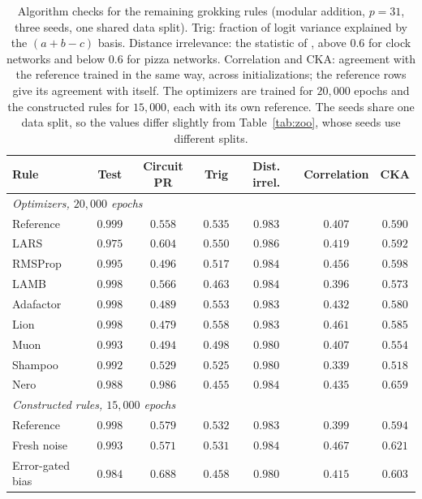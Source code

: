\documentclass{article} %
\begin{document}
\begin{table}[!ht]
\caption{Algorithm checks for the remaining grokking rules (modular addition, $p=31$, three seeds, one shared data split). Trig: fraction of logit variance explained by the $(a+b-c)$ basis. Distance irrelevance: the statistic of \citet{zhong2023clock}, above $0.6$ for clock networks and below $0.6$ for pizza networks. Correlation and CKA: agreement with the reference trained in the same way, across initializations; the reference rows give its agreement with itself. The optimizers are trained for $20{,}000$ epochs and the constructed rules for $15{,}000$, each with its own reference. The seeds share one data split, so the values differ slightly from Table~\ref{tab:zoo}, whose seeds use different splits.}
\label{tab:algoall}
\begin{center}
\small
\setlength{\tabcolsep}{3pt}
\begin{tabular}{lcccccc}
\toprule
Rule & Test & Circuit PR & Trig & Dist. irrel. & Correlation & CKA \\
\midrule
\multicolumn{7}{l}{\emph{Optimizers, $20{,}000$ epochs}} \\
Reference & $0.999$ & $0.558$ & $0.535$ & $0.983$ & $0.407$ & $0.590$ \\
LARS & $0.975$ & $0.604$ & $0.550$ & $0.986$ & $0.419$ & $0.592$ \\
RMSProp & $0.995$ & $0.496$ & $0.517$ & $0.984$ & $0.456$ & $0.598$ \\
LAMB & $0.998$ & $0.566$ & $0.463$ & $0.984$ & $0.396$ & $0.573$ \\
Adafactor & $0.998$ & $0.489$ & $0.553$ & $0.983$ & $0.432$ & $0.580$ \\
Lion & $0.998$ & $0.479$ & $0.558$ & $0.983$ & $0.461$ & $0.585$ \\
Muon & $0.993$ & $0.494$ & $0.498$ & $0.980$ & $0.407$ & $0.554$ \\
Shampoo & $0.992$ & $0.529$ & $0.525$ & $0.980$ & $0.339$ & $0.518$ \\
Nero & $0.988$ & $0.986$ & $0.455$ & $0.984$ & $0.435$ & $0.659$ \\
\midrule
\multicolumn{7}{l}{\emph{Constructed rules, $15{,}000$ epochs}} \\
Reference & $0.998$ & $0.579$ & $0.532$ & $0.983$ & $0.399$ & $0.594$ \\
Fresh noise & $0.993$ & $0.571$ & $0.531$ & $0.984$ & $0.467$ & $0.621$ \\
Error-gated bias & $0.984$ & $0.688$ & $0.458$ & $0.980$ & $0.415$ & $0.603$ \\
\bottomrule
\end{tabular}
\end{center}
\end{table}
\end{document}
